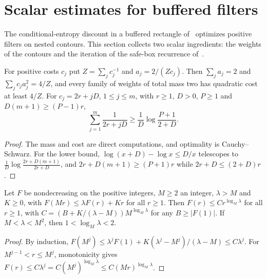 
\section{Scalar estimates for buffered filters}
\label{ch:buffered_filters}

The conditional-entropy discount in a buffered rectangle
of~\cite[Lemma~3.2]{OpenAI2026AreaLaw} optimizes positive filters on nested
contours. This section collects two scalar ingredients: the weights of the
contours and the iteration of the safe-box recurrence
of~\cite[Proposition~3.3]{OpenAI2026AreaLaw}.

\begin{lemma}
    \label{lem:harmonic_weights}
    \leanok
    For positive costs $c_j$ put $Z=\sum_j c_j^{-1}$ and $a_j=2/(Zc_j)$. Then
    $\sum_ja_j=2$ and $\sum_jc_ja_j^2=4/Z$, and every family of weights of
    total mass two has quadratic cost at least $4/Z$. For $c_j=2r+jD$,
    $1\le j\le m$, with $r\ge1$, $D>0$, $P\ge1$ and $D(m+1)\ge(P-1)r$,
    \[
        \sum_{j=1}^m\frac1{2r+jD}\ge\frac1D\log\frac{P+1}{2+D}.
    \]
\end{lemma}
\begin{proof}\leanok
    The mass and cost are direct computations, and optimality is
    Cauchy--Schwarz. For the lower bound, $\log(x+D)-\log x\le D/x$
    telescopes to $\frac1D\log\frac{2r+D(m+1)}{2r+D}$, and
    $2r+D(m+1)\ge(P+1)r$ while $2r+D\le(2+D)r$.
\end{proof}

\begin{lemma}
    \label{lem:scale_recurrence}
    \leanok
    Let $F$ be nondecreasing on the positive integers, $M\ge2$ an integer,
    $\lambda>M$ and $K\ge0$, with $F(Mr)\le\lambda F(r)+Kr$ for all
    $r\ge1$. Then $F(r)\le Cr^{\log_M\lambda}$ for all $r\ge1$, with
    $C=(B+K/(\lambda-M))M^{\log_M\lambda}$ for any $B\ge|F(1)|$. If
    $M<\lambda<M^2$, then $1<\log_M\lambda<2$.
\end{lemma}
\begin{proof}\leanok
    By induction,
    $F(M^j)\le\lambda^jF(1)+K(\lambda^j-M^j)/(\lambda-M)\le C\lambda^j$.
    For $M^{j-1}<r\le M^j$, monotonicity gives
    $F(r)\le C\lambda^j=C(M^j)^{\log_M\lambda}\le C(Mr)^{\log_M\lambda}$.
\end{proof}
